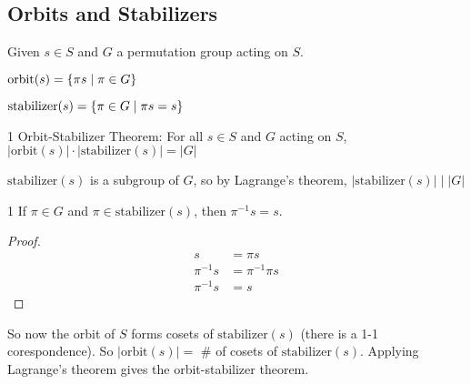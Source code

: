 


\subsection{Orbits and Stabilizers}

Given $s \in S$ and $G$ a permutation group acting on $S$.

\begin{definition}
    $\text{orbit}(s) = \left\{ \pi s \mid \pi \in G \right\}$
\end{definition}

\begin{definition}
    $\text{stabilizer}(s) = \left\{ \pi \in G  \mid \pi s = s \right\}$
\end{definition}

\begin{theorem}1
    Orbit-Stabilizer Theorem: For all $s \in S$ and $G$ acting on $S$, $|\text{orbit}(s)| \cdot |\text{stabilizer}(s)| = |G|$
\end{theorem}

$\text{stabilizer}(s)$ is a subgroup of $G$, so by Lagrange's theorem, $|\text{stabilizer}(s)| \mid |G|$

\begin{lemma}1
    If $\pi \in G$ and $\pi \in \text{stabilizer}(s)$, then $\pi^{-1} s=s$.
\end{lemma}
\begin{proof}
    \begin{align*}
        s &= \pi s \\ 
        \pi^{-1} s &= \pi^{-1} \pi s \\ 
        \pi^{-1} s &= s
    \end{align*}
\end{proof}

So now the orbit of $S$ forms cosets of $\text{stabilizer}(s)$ (there is a 1-1 corespondence). 
So $|\text{orbit}(s)| = $ \# of cosets of $\text{stabilizer}(s)$. Applying Lagrange's theorem
gives the orbit-stabilizer theorem.